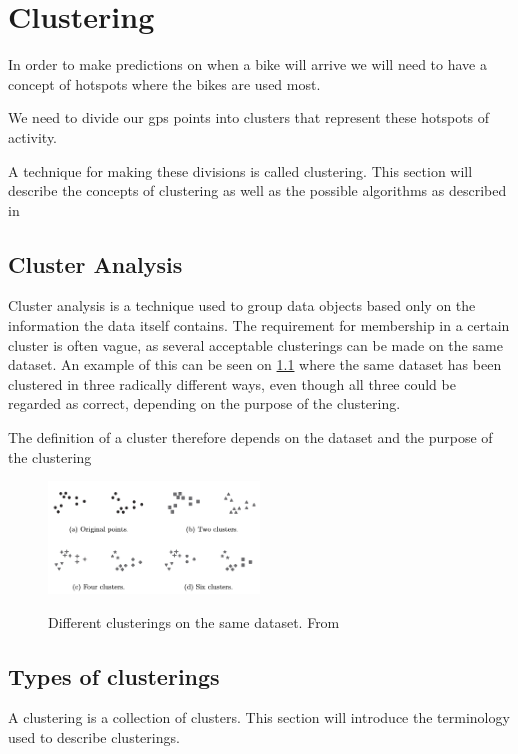 \chapter{Clustering}

In order to make predictions on when a bike will arrive we will need to have a concept of hotspots where the bikes are used most.

We need to divide our gps points into clusters that represent these hotspots of activity.

A technique for making these divisions is called clustering.
This section will describe the concepts of clustering as well as the possible algorithms as described in \citet{pang2006introduction}

\section{Cluster Analysis}
Cluster analysis is a technique used to group data objects based only on the information the data itself contains.
The requirement for membership in a certain cluster is often vague, as several acceptable clusterings can be made on the same dataset.
An example of this can be seen on \cref{clusterings} where the same dataset has been clustered in three radically different ways, even though all three could be regarded as correct, depending on the purpose of the clustering.

The definition of a cluster therefore depends on the dataset and the purpose of the clustering 

\begin{figure}[H]
\includegraphics[width=0.5\textwidth]{graphics/clusterings}
\label{clusterings}
\caption{Different clusterings on the same dataset. From \citet{pang2006introduction}}
\end{figure}

\section{Types of clusterings}

A clustering is a collection of clusters.
This section will introduce the terminology used to describe clusterings. 


